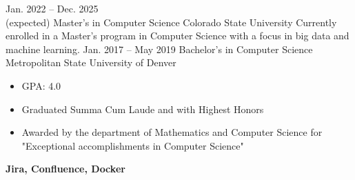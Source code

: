 \documentclass[8pt]{resumeclass}
\begin{document}

\begin{entrylist}
	\entry
		{Jan. 2022 -- Dec. 2025\\ (expected)}
		{Master's in Computer Science}
		{Colorado State University}
		{Currently enrolled in a Master's program in Computer Science with a focus in big data and machine learning.}
	\entry
		{Jan. 2017 -- May 2019}
		{Bachelor's in Computer Science}
		{Metropolitan State University of Denver}
		{{\vspace{-4mm}\begin{itemize}[noitemsep,nolistsep]
			\small
			\item GPA: 4.0
			\item Graduated Summa Cum Laude and with Highest Honors
			\item Awarded by the department of Mathematics and Computer Science for "Exceptional accomplishments in Computer Science"
		\end{itemize}}}
\end{entrylist}


\vspace{6pt}
\begin{minipage}[t]{0.5\textwidth}
	\vspace{-\baselineskip}

\end{minipage}
\hfill
\begin{minipage}[t]{0.5\textwidth}
	\vspace{-\baselineskip}

	\textbf{Jira, Confluence, Docker}\\
\end{minipage}
\end{document}
